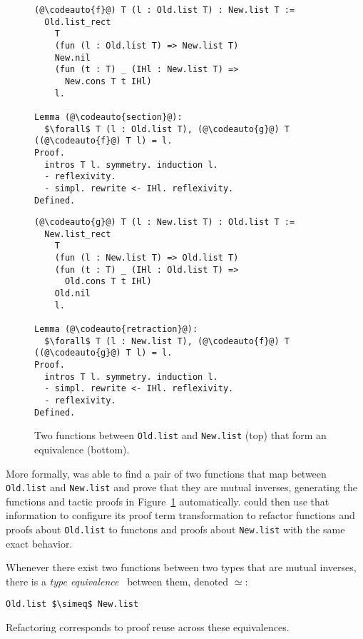 \begin{figure}
\begin{minipage}{0.48\textwidth}
\begin{lstlisting}
(@\codeauto{f}@) T (l : Old.list T) : New.list T :=
  Old.list_rect
    T
    (fun (l : Old.list T) => New.list T)
    New.nil
    (fun (t : T) _ (IHl : New.list T) =>
      New.cons T t IHl)
    l.

Lemma (@\codeauto{section}@):
  $\forall$ T (l : Old.list T), (@\codeauto{g}@) T ((@\codeauto{f}@) T l) = l.
Proof.
  intros T l. symmetry. induction l.
  - reflexivity.
  - simpl. rewrite <- IHl. reflexivity.
Defined.
\end{lstlisting}
\end{minipage}
\hfill
\begin{minipage}{0.48\textwidth}
\begin{lstlisting}
(@\codeauto{g}@) T (l : New.list T) : Old.list T :=
  New.list_rect
    T
    (fun (l : New.list T) => Old.list T)
    (fun (t : T) _ (IHl : Old.list T) =>
      Old.cons T t IHl)
    Old.nil
    l.

Lemma (@\codeauto{retraction}@):
  $\forall$ T (l : New.list T), (@\codeauto{f}@) T ((@\codeauto{g}@) T l) = l.
Proof.
  intros T l. symmetry. induction l.
  - simpl. rewrite <- IHl. reflexivity.
  - reflexivity.
Defined.
\end{lstlisting}
\end{minipage}
\caption{Two functions between \lstinline{Old.list} and \lstinline{New.list} (top) that form an equivalence (bottom).}
\label{fig:equivalence}
\end{figure}

More formally, \toolname was able to find a pair of two functions that map between \lstinline{Old.list}
and \lstinline{New.list} and prove that they are mutual inverses, generating the functions and tactic
proofs in Figure~\ref{fig:equivalence} automatically.
\toolname could then use that information to configure its proof term transformation to refactor
functions and proofs about \lstinline{Old.list} to functons and proofs about \lstinline{New.list} with
the same exact behavior.

Whenever there exist two functions between two types that are mutual inverses,
there is a \textit{type equivalence}~\cite{univalent2013homotopy} between them, denoted $\simeq$:

\begin{lstlisting}
Old.list $\simeq$ New.list
\end{lstlisting}
Refactoring corresponds to proof reuse across these equivalences.

